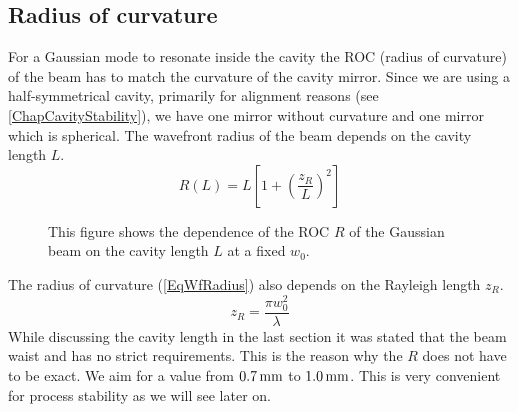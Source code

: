 \subsection{Radius of curvature}
For a Gaussian mode to resonate inside the cavity the ROC (radius of curvature) of the beam has to match the curvature of the cavity mirror. Since we are using a half-symmetrical cavity, primarily for alignment reasons (see \autoref{ChapCavityStability}), we have one mirror without curvature and one mirror which is spherical. The wavefront radius of the beam depends on the cavity length $L$.
\begin{equation}\label{EqWfRadius}
	R(L)=L\left[1+\left(\frac{z_{\si{R}}}{L}\right)^2\right]
\end{equation}
\begin{figure}[H]
	
	\caption{This figure shows the dependence of the ROC $R$ of the Gaussian beam on the cavity length $L$ at a fixed $w_0$.}
\end{figure}
The radius of curvature (\autoref{EqWfRadius}) also depends on the Rayleigh length $z_{\si{R}}$.
\begin{equation}\label{EqRayleighRange}
	z_{\si{R}}=\frac{\pi w_0^2}{\lambda}
\end{equation}
While discussing the cavity length in the last section it was stated that the beam waist and has no strict requirements. This is the reason why the $R$ does not have to be exact. We aim for a value from $0.7\,\text{mm}$ to $1.0\,\text{mm}$. This is very convenient for process stability as we will see later on.

